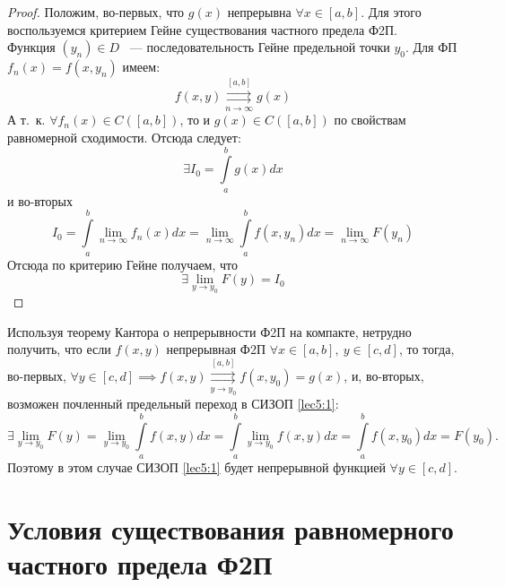 \documentclass[../../main.tex]{subfiles}
\begin{document}
\begin{proof}
	Положим, во-первых, что $ g(x) $ непрерывна $ \forall x \in [a, b] $.
	Для этого воспользуемся критерием Гейне существования частного предела Ф2П.
	\\
	Функция $(y_n) \in D$ ~--- последовательность Гейне предельной точки $y_0$.
	Для ФП $ f_n(x) = f(x, y_n) $ имеем:
	\[
	f(x, y) \stackrel{[a, b]}{\underset{n \to \infty}{\rightrightarrows}} g(x)
	\]
	А т.~к. $ \forall f_n(x) \in C([a, b])$, то и $ g(x) \in C([a, b]) $ по 
	свойствам равномерной сходимости.
	Отсюда следует:
	\[
	\exists I_0 = \int\limits_a^b g(x) dx
	\]
	и во-вторых
	\[
	I_0 = \int\limits_a^b \lim\limits_{n \to \infty} f_n(x) dx = 
	\lim\limits_{n \to \infty} \int\limits_a^b f(x, y_n) dx = 
	\lim\limits_{n \to \infty} F(y_n)
	\]
	Отсюда по критерию Гейне получаем, что
	\[
	\exists \lim\limits_{y \to y_0} F(y) = I_0
	\]
\end{proof}
\begin{rem}
	Используя теорему Кантора о непрерывности Ф2П на компакте, нетрудно получить,
	что если $ f(x, y) $ непрерывная Ф2П $ \forall x \in [a, b],\ 
	y \in [c, d] $, то тогда, во-первых, $ \forall y \in [c, d] \implies 
	f(x, y) \stackrel{[a, b]}{\underset{y \to y_0}{\rightrightarrows}} f(x, y_0)
	= g(x)
	$, и, во-вторых, возможен почленный предельный переход 
	в СИЗОП \eqref{lec5:1}:
	\[
	\exists \lim\limits_{y \to y_0} F(y) = 
	\lim\limits_{y \to y_0} \int\limits_a^b f(x, y) dx = 
	\int\limits_a^b \lim\limits_{y \to y_0} f(x, y) dx =
	\int\limits_a^b f(x, y_0) dx = F(y_0).
	\]
	Поэтому в этом случае СИЗОП \eqref{lec5:1} будет непрерывной функцией 
	$ \forall y \in [c, d] $.
\end{rem}

\section{Условия существования равномерного частного предела Ф2П}
\end{document}
